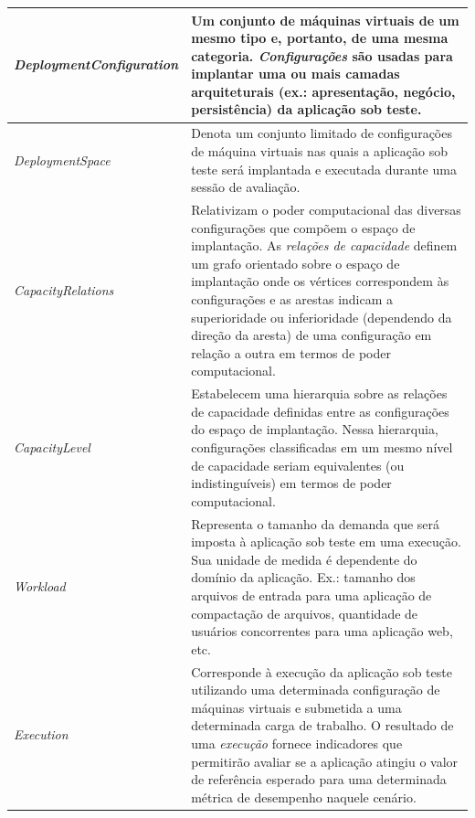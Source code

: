 \documentclass[10pt,conference,compsocconf]{IEEEtran}
\begin{document}
\begin{table}[t*]
\begin{tabularx}{\linewidth}{|p{1.35cm}|X|}
\\%
\hline
\emph{Deployment\newline Configuration} &
Um conjunto de máquinas virtuais de um mesmo tipo e, portanto, de uma mesma categoria. {\em Configurações} são usadas para implantar uma ou mais camadas arquiteturais (ex.: apresentação, negócio, persistência) da aplicação sob teste.
\\%
\hline
\emph{Deployment\newline Space} &
Denota um conjunto limitado de configurações de máquina virtuais nas quais a aplicação sob teste será implantada e executada durante uma sessão de avaliação. 
\\%
\hline
\emph{Capacity\newline Relations} &
Relativizam o poder computacional das diversas configurações que compõem o espaço de implantação. As {\em relações de capacidade} definem um grafo orientado sobre o espaço de implantação onde os vértices correspondem às configurações e as arestas indicam a superioridade ou inferioridade (dependendo da direção da aresta) de uma configuração em relação a outra em termos de poder computacional.  
\\%
\hline
\emph{Capacity\newline Level} &
Estabelecem uma hierarquia sobre as relações de capacidade definidas entre as configurações do espaço de implantação. Nessa hierarquia, configurações classificadas em um mesmo nível de capacidade seriam equivalentes (ou indistinguíveis) em termos de poder computacional. 
\\%
\hline
\emph{Workload} &
Representa o tamanho da demanda que será imposta à aplicação sob teste em uma execução. Sua unidade de medida é dependente do domínio da aplicação. Ex.: tamanho dos arquivos de entrada para uma aplicação de compactação de arquivos, quantidade de usuários concorrentes para uma aplicação web, etc.
\\%
\hline
\emph{Execution} &
Corresponde à execução da aplicação sob teste utilizando uma determinada configuração de máquinas virtuais e submetida a uma determinada carga de trabalho. O resultado de uma {\em execução} fornece indicadores que permitirão avaliar se a aplicação atingiu o valor de referência esperado para uma determinada métrica de desempenho naquele cenário.
\\
\hline%
\end{tabularx}
\end{table}
\end{document}
